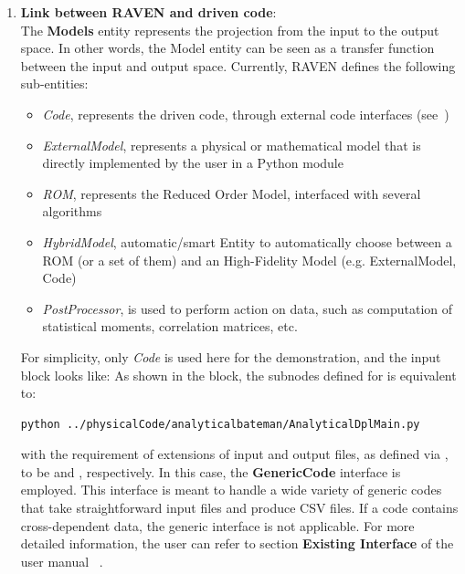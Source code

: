 \begin{enumerate}
   \item \textbf{Link between RAVEN and driven code}: 
     \\ The \textbf{Models} entity represents the projection from the input to the output space. In other words,
     the Model entity can be seen as a transfer function between the input and output space. Currently, RAVEN
     defines the following sub-entities:
     \begin{itemize}
       \item \textit{Code}, represents the driven code, through external code interfaces (see~\cite{RAVENuserManual})
       \item  \textit{ExternalModel}, represents a physical or mathematical model that is directly implemented by
         the user in a Python module
       \item \textit{ROM}, represents the Reduced Order Model, interfaced with several algorithms
        \item \textit{HybridModel}, automatic/smart Entity to automatically choose between a ROM (or a set of them) 
        and an High-Fidelity Model (e.g. ExternalModel, Code)
       \item \textit{PostProcessor}, is used to perform action on data, such as computation of statistical moments,
         correlation matrices, etc.
     \end{itemize}
     For simplicity, only \textit{Code} is used here for the demonstration, and the input block looks like:
     As shown in the  block, the subnodes defined for  is equivalent to:
     \begin{lstlisting}[language=bash]
     python ../physicalCode/analyticalbateman/AnalyticalDplMain.py
     \end{lstlisting}
     with the requirement of extensions of input and output files, as defined via , to be 
      and , respectively. In this case, the \textbf{GenericCode} interface is employed.
     This interface is meant to handle a wide variety of generic codes that take straightforward input files and produce
     CSV files. \nb If a code contains cross-dependent data, the generic interface is not applicable. For more detailed
     information, the user can refer to section \textbf{Existing Interface} of the user manual ~\cite{RAVENuserManual}.


\end{enumerate}
